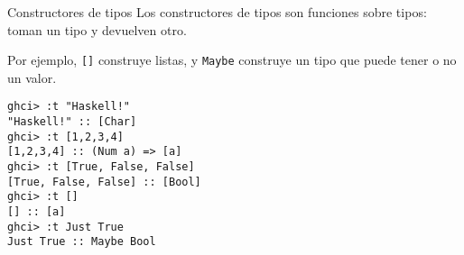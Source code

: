 \begin{frame}[fragile]{Constructores de tipos}
  Los constructores de tipos son funciones sobre tipos: toman un tipo y devuelven otro.

  \espacio

  Por ejemplo, \texttt{[]} construye listas, y \texttt{Maybe} construye un tipo
  que puede tener o no un valor.

  \begin{lstlisting}
ghci> :t "Haskell!"
"Haskell!" :: [Char]
ghci> :t [1,2,3,4]
[1,2,3,4] :: (Num a) => [a]
ghci> :t [True, False, False]
[True, False, False] :: [Bool]
ghci> :t []
[] :: [a]
ghci> :t Just True
Just True :: Maybe Bool
  \end{lstlisting}
\end{frame}
